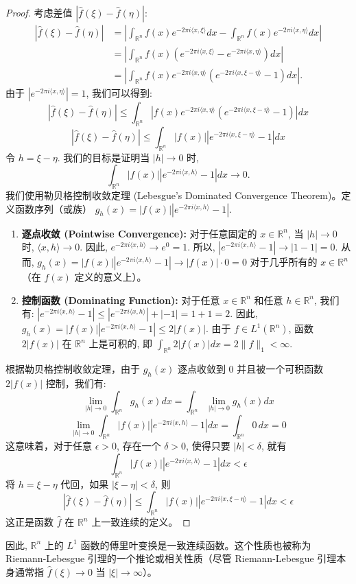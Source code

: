 \begin{proof}
考虑差值 $|\widehat{f}(\xi) - \widehat{f}(\eta)|$:
\[
\begin{aligned}
|\widehat{f}(\xi) - \widehat{f}(\eta)| & = \left| \int_{\mathbb{R}^n} f(x) e^{-2\pi i \langle x, \xi \rangle} dx - \int_{\mathbb{R}^n} f(x) e^{-2\pi i \langle x, \eta \rangle} dx \right| \\
& = \left| \int_{\mathbb{R}^n} f(x) (e^{-2\pi i \langle x, \xi \rangle} - e^{-2\pi i \langle x, \eta \rangle}) dx \right| \\
& = \left| \int_{\mathbb{R}^n} f(x) e^{-2\pi i \langle x, \eta \rangle} (e^{-2\pi i \langle x, \xi - \eta \rangle} - 1) dx \right|.
\end{aligned}
\]
由于 $|e^{-2\pi i \langle x, \eta \rangle}| = 1$, 我们可以得到:
\[
|\widehat{f}(\xi) - \widehat{f}(\eta)| \le \int_{\mathbb{R}^n} |f(x) e^{-2\pi i \langle x, \eta \rangle} (e^{-2\pi i \langle x, \xi - \eta \rangle} - 1)| dx
\]
\[
|\widehat{f}(\xi) - \widehat{f}(\eta)| \le \int_{\mathbb{R}^n} |f(x)| |e^{-2\pi i \langle x, \xi - \eta \rangle} - 1| dx
\]
令 $h = \xi - \eta$. 我们的目标是证明当 $|h| \to 0$ 时,
\[
\int_{\mathbb{R}^n} |f(x)| |e^{-2\pi i \langle x, h \rangle} - 1| dx \to 0.
\]
我们使用勒贝格控制收敛定理 (Lebesgue's Dominated Convergence Theorem)。定义函数序列（或族） $g_h(x) = |f(x)| |e^{-2\pi i \langle x, h \rangle} - 1|$.

\begin{enumerate}
	\item \textbf{逐点收敛 (Pointwise Convergence):}
对于任意固定的 $x \in \mathbb{R}^n$, 当 $|h| \to 0$ 时, $\langle x, h \rangle \to 0$. 因此, $e^{-2\pi i \langle x, h \rangle} \to e^0 = 1$. 所以, $|e^{-2\pi i \langle x, h \rangle} - 1| \to |1 - 1| = 0$. 从而, $g_h(x) = |f(x)| |e^{-2\pi i \langle x, h \rangle} - 1| \to |f(x)| \cdot 0 = 0$ 对于几乎所有的 $x \in \mathbb{R}^n$（在 $f(x)$ 定义的意义上）。
	\item \textbf{控制函数 (Dominating Function):}
对于任意 $x \in \mathbb{R}^n$ 和任意 $h \in \mathbb{R}^n$, 我们有:
$|e^{-2\pi i \langle x, h \rangle} - 1| \le |e^{-2\pi i \langle x, h \rangle}| + |-1| = 1 + 1 = 2$. 因此, $g_h(x) = |f(x)| |e^{-2\pi i \langle x, h \rangle} - 1| \le 2|f(x)|$. 由于 $f \in L^1(\mathbb{R}^n)$, 函数 $2|f(x)|$ 在 $\mathbb{R}^n$ 上是可积的, 即 $\int_{\mathbb{R}^n} 2|f(x)| dx = 2\|f\|_1 < \infty$.
\end{enumerate}

根据勒贝格控制收敛定理，由于 $g_h(x)$ 逐点收敛到 $0$ 并且被一个可积函数 $2|f(x)|$ 控制，我们有:
\[
\lim_{|h| \to 0} \int_{\mathbb{R}^n} g_h(x) dx = \int_{\mathbb{R}^n} \lim_{|h| \to 0} g_h(x) dx
\]
\[
\lim_{|h| \to 0} \int_{\mathbb{R}^n} |f(x)| |e^{-2\pi i \langle x, h \rangle} - 1| dx = \int_{\mathbb{R}^n} 0 \, dx = 0
\]
这意味着，对于任意 $\epsilon > 0$, 存在一个 $\delta > 0$, 使得只要 $|h| < \delta$, 就有
\[
\int_{\mathbb{R}^n} |f(x)| |e^{-2\pi i \langle x, h \rangle} - 1| dx < \epsilon
\]
将 $h = \xi - \eta$ 代回，如果 $|\xi - \eta| < \delta$, 则
\[
|\widehat{f}(\xi) - \widehat{f}(\eta)| \le \int_{\mathbb{R}^n} |f(x)| |e^{-2\pi i \langle x, \xi - \eta \rangle} - 1| dx < \epsilon
\]
这正是函数 $\widehat{f}$ 在 $\mathbb{R}^n$ 上一致连续的定义。
\end{proof}

因此, $\mathbb{R}^n$ 上的 $L^1$ 函数的傅里叶变换是一致连续函数。这个性质也被称为 Riemann-Lebesgue 引理的一个推论或相关性质（尽管 Riemann-Lebesgue 引理本身通常指 $\widehat{f}(\xi) \to 0$ 当 $|\xi| \to \infty$）。
